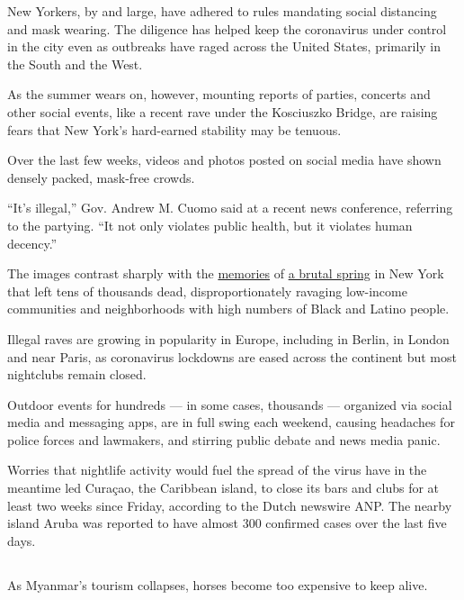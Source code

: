 New Yorkers, by and large, have adhered to rules mandating social
distancing and mask wearing. The diligence has helped keep the
coronavirus under control in the city even as outbreaks have raged
across the United States, primarily in the South and the West.

As the summer wears on, however, mounting reports of parties, concerts
and other social events, like a recent rave under the Kosciuszko Bridge,
are raising fears that New York's hard-earned stability may be tenuous.

Over the last few weeks, videos and photos posted on social media have
shown densely packed, mask-free crowds.

``It's illegal,'' Gov. Andrew M. Cuomo said at a recent news conference,
referring to the partying. ``It not only violates public health, but it
violates human decency.''

The images contrast sharply with the
\href{https://www.nytimes.com/2020/08/07/style/coronavirus-nyc-historic-season.html}{memories}
of
\href{https://www.nytimes.com/2020/04/04/nyregion/coronavirus-hospital-brooklyn.html}{a
brutal spring} in New York that left tens of thousands dead,
disproportionately ravaging low-income communities and neighborhoods
with high numbers of Black and Latino people.

Illegal raves are growing in popularity in Europe, including in Berlin,
in London and near Paris, as coronavirus lockdowns are eased across the
continent but most nightclubs remain closed.

Outdoor events for hundreds --- in some cases, thousands --- organized
via social media and messaging apps, are in full swing each weekend,
causing headaches for police forces and lawmakers, and stirring public
debate and news media panic.

Worries that nightlife activity would fuel the spread of the virus have
in the meantime led Curaçao, the Caribbean island, to close its bars and
clubs for at least two weeks since Friday, according to the Dutch
newswire ANP. The nearby island Aruba was reported to have almost 300
confirmed cases over the last five days.

\hypertarget{section-7}{%
\subsection{}\label{section-7}}

As Myanmar's tourism collapses, horses become too expensive to keep
alive.

